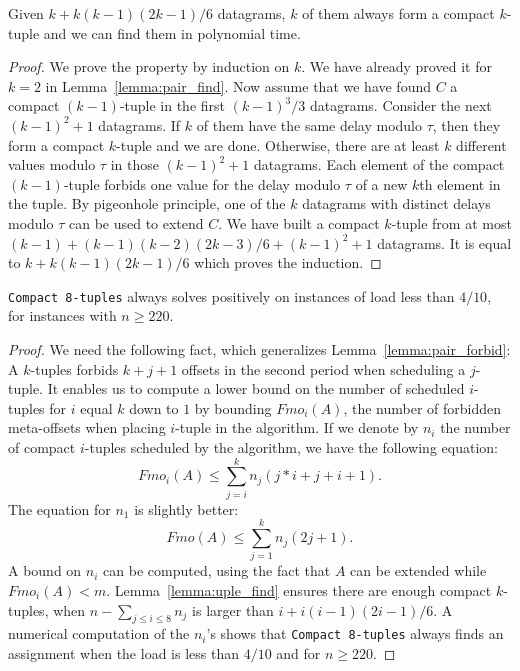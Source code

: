 \begin{lemma}\label{lemma:uple_find}
Given $k + k(k-1)(2k-1)/6$ datagrams, $k$ of them always form a compact $k$-tuple and we can find them in polynomial time. 
\end{lemma}
\begin{proof}
We prove the property by induction on $k$. We have already proved it for $k=2$ in Lemma~\ref{lemma:pair_find}.
Now assume that we have found $C$ a compact $(k-1)$-tuple in the first $(k-1)^3/3$
datagrams. Consider the next $(k-1)^2 + 1$ datagrams. If $k$ of them have the same delay modulo $\tau$,
then they form a compact $k$-tuple and we are done. Otherwise, there are at least $k$ different values modulo $\tau$
in those $(k-1)^2 + 1$ datagrams. Each element of the compact $(k-1)$-tuple forbids one value for the delay modulo $\tau$ of a new $k$th element in the tuple. By pigeonhole principle, one of the $k$ datagrams with distinct delays modulo $\tau$ can be used to extend $C$. We have built a compact $k$-tuple from at most $(k-1) + (k-1)(k-2)(2k-3)/6 + (k-1)^2 + 1$ datagrams.
It is equal to $k + k(k-1)(2k-1)/6$ which proves the induction.
\end{proof}


\begin{theorem}\label{th:k-tuples}
\texttt{Compact 8-tuples} always solves \pma positively on instances of load less than $4/10$, for instances with $n \geq 220$.
\end{theorem}
\begin{proof}
We need the following fact, which generalizes Lemma~\ref{lemma:pair_forbid}: A $k$-tuples forbids $k+j+1$ offsets in the second period when scheduling a $j$-tuple. %
It enables us to compute a lower bound on the number of scheduled $i$-tuples for $i$ equal $k$ down to $1$ by bounding $Fmo_i(A)$, the number of forbidden meta-offsets when placing $i$-tuple in the algorithm.
If we denote by $n_i$ the number of compact $i$-tuples scheduled by the algorithm,
we have the following equation:  $$ Fmo_i(A) \leq \displaystyle{\sum_{j=i}^k n_j(j*i + j + i+ 1)}.$$
The equation for $n_1$ is slightly better: 
$$ Fmo(A) \leq \displaystyle{\sum_{j=1}^k n_j(2j + 1)}.$$
A bound on $n_i$ can be computed, using the fact that $A$ can be extended while $Fmo_i(A) < m$. 
Lemma~\ref{lemma:uple_find} ensures there are enough compact $k$-tuples, when $n - \sum_{j \leq i \leq 8} n_j$ is larger than $i + i(i-1)(2i-1)/6$. 
A numerical computation of the $n_i$'s shows that \texttt{Compact 8-tuples} always finds an assignment when the load is less than $4/10$ and for $n \geq 220$.
\end{proof}


